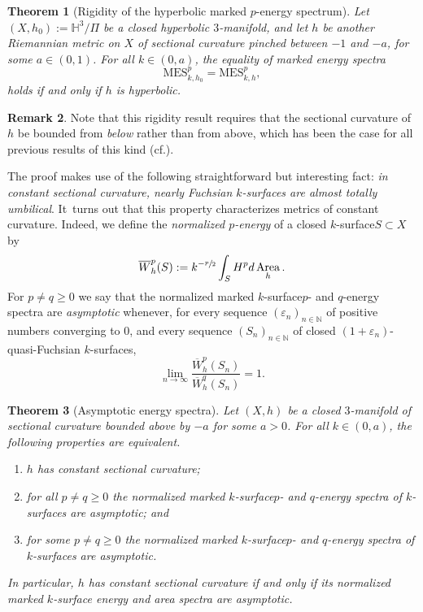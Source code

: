 \documentclass[11pt]{article}
\newcommand{\cf}{cf.\xspace}
\newcommand{\ksurface}{$k$\nobreakdash-surface\xspace}
\newcommand{\ksurfaces}{$k$\nobreakdash-surfaces\xspace}
\theoremstyle{plain}
\newtheorem{theorem}{Theorem}[section]
\theoremstyle{definition}
\newtheorem{remark}[theorem]{Remark}
\newcommand\Hyp{\mathbb{H}^3}
\newcommand{\N}{{\mathbb N}}
\let\eps\varepsilon
\let\dans\subset
\DeclareMathOperator{\Area}{Area}
\begin{document}
\begin{theorem}[Rigidity of the hyperbolic marked $p$-energy spectrum]\label{thm.Rigidity_hyp_energy_spectrum}
Let $(X,h_0):=\Hyp/\Pi$ be a closed hyperbolic $3$\nobreakdash-manifold, and let $h$ be another Riemannian metric on $X$ of sectional curvature pinched between $-1$ and $-a$, for some $a\in(0,1)$. For all $k\in(0,a)$, the equality of marked energy spectra
\begin{equation}\label{eqn.rigidity_energy}
\mathrm{MES}^p_{k,h_0}=\mathrm{MES}^p_{k,h},
\end{equation}
holds if and only if $h$ is hyperbolic.
\end{theorem}

\begin{remark}
Note that this rigidity result requires that the sectional curvature of~$h$ be bounded from \emph{below} rather than from above, which has been the case for all previous results of this kind (\cf \cite{ALS,CMN}).
\end{remark}

The proof makes use of the following straightforward but interesting fact: \emph{in constant sectional curvature, nearly Fuchsian \ksurfaces are almost totally umbilical}. It~turns out that this property characterizes metrics of constant curvature. Indeed, we define the \emph{normalized $p$-energy} of a closed \ksurface $S\dans X$ by
\begin{equation*}
\overline{W}^{p}_h(S) := k^{-\sfrac{p}{2}}\int_S H^p d\Area_h.
\end{equation*}
For $p\neq q\geq 0$ we say that the normalized marked \ksurface $p$- and $q$-energy spectra are \emph{asymptotic} whenever, for every sequence $(\eps_n)_{n\in\N}$ of positive numbers converging to $0$, and every sequence $(S_n)_{n\in\N}$ of closed $(1+\eps_n)$-quasi-Fuchsian \ksurfaces,
\begin{equation*}
\lim_{n\to\infty}\frac{\overline{W}^{p}_h(S_n)}{\overline{W}^{q}_h(S_n)}=1.
\end{equation*}

\begin{theorem}[Asymptotic energy spectra]\label{thm.asymptotic_spectra}
Let $(X,h)$ be a closed $3$\nobreakdash-manifold of sectional curvature bounded above by $-a$ for some $a>0$. For all $k\in(0,a)$, the following properties are equivalent.
\begin{enumerate}
\item $h$ has constant sectional curvature;
\item for all $p\neq q\geq 0$ the normalized marked \ksurface $p$- and $q$-energy spectra of \ksurfaces are asymptotic; and
\item for some $p\neq q\geq 0$ the normalized marked \ksurface $p$- and $q$-energy spectra of \ksurfaces are asymptotic.
\end{enumerate}
\noindent In particular, $h$ has constant sectional curvature if and only if its normalized marked \ksurface energy and area spectra are asymptotic.
\end{theorem}
\end{document}
